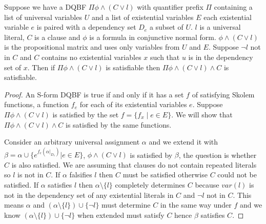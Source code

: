 \documentclass[runningheads]{llncs}
\begin{document}
	\begin{lemma}\label{lem:redsound}
		
		Suppose we have a DQBF $\Pi \phi\wedge (C\vee l )$ with quantifier prefix $\Pi$ containing a list of universal variables $U$ and a list of existential variables $E$ each existential variable $e$ is paired with a dependency set $D_e$ a subset of $U$. 
		$l$ is a universal literal, $C$ is a clause and $\phi$ is a formula in conjunctive normal form.
		$\phi\wedge (C\vee l )$ is the propositional matrix and uses only variables from $U$ and $E$.
		Suppose $\neg l $ not in $C$ and $C$ contains no existential variables $x$ such that $u$ is in the dependency set of $x$. 
		Then if $\Pi \phi\wedge (C\vee l )$ is satisfiable then $\Pi \phi\wedge (C\vee l )\wedge C$ is satisfiable. 
		
	\end{lemma}
	\begin{proof}
		An S-form DQBF is true if and only if it has a set $f$ of satisfying Skolem functions, a function $f_e$ for each of its existential variables $e$.
		Suppose $\Pi \phi \wedge (C\vee l )$ is satisfied by the set $f= \{f_x \mid e\in E\}$.
		We will show that $\Pi \phi \wedge (C\vee l )\wedge C$ is satisfied by the same functions. 
		
		Consider an arbitrary universal assignment $\alpha$ and we extend it with $\beta=\alpha\cup\{e^{f_e(\alpha|_{D_e})} | e\in E\}$,
		$\phi\wedge (C\vee l)$ is satisfied by $\beta$, the question is whether $C$ is also satisfied.
		We are assuming that clauses do not contain repeated literals so $l$ is not in $C$.
		If $\alpha$ falsifies $l$ then $C$ must be satisfied otherwise $C$ could not be satisfied.
		If $\alpha$ satisfies $l$ then $\alpha\setminus \{l \}$ completely determines $C$ because $var(l)$ is not in the dependency set of any existential literals in $C$ and $\neg l$ not in $C$. This means $\alpha$ and $(\alpha\setminus \{l \})\cup\{ \neg l\}$ must determine $C$ in the same way under $f$ and we know  $(\alpha\setminus \{l \})\cup\{ \neg l\}$ when extended must satisfy $C$ hence $\beta$ satisfies $C$.
	\end{proof}
\end{document}
